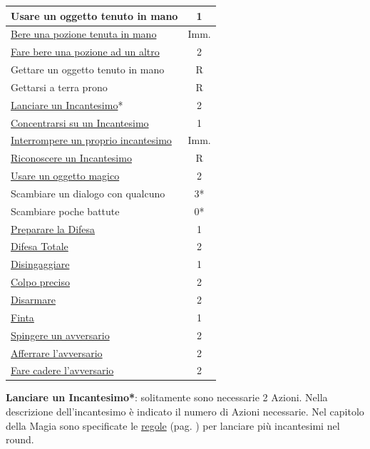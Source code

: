 \begin{multicols}{2}
\begin{tabularx}{1\linewidth}{Xc}
Usare un oggetto tenuto in mano& 1\\
\midrule
\rowcolor{gray!20}\hyperlink{insorgenzaveleno}{Bere una pozione tenuta in mano}& Imm.\\
\hyperlink{insorgenzaveleno}{Fare bere una pozione ad un altro} & 2\\
\midrule
\rowcolor{gray!20}Gettare un oggetto tenuto in mano& R\\
Gettarsi a terra prono& R\\
\midrule
\rowcolor{gray!20}\hyperlink{magietempodilancio}{Lanciare un Incantesimo}*& 2\\
\hyperlink{magieconcentrazione}{Concentrarsi su un Incantesimo}& 1\\
\rowcolor{gray!20}\hyperlink{magiedurata}{Interrompere un proprio incantesimo} & Imm.\\
\hyperlink{riconoscereincantesimo}{Riconoscere un Incantesimo}& R\\
\rowcolor{gray!20}\hyperlink{regoleoggettimagici}{Usare un oggetto magico}& 2\\
\midrule
Scambiare un dialogo con qualcuno& 3*\\
\rowcolor{gray!20}Scambiare poche battute& 0*\\
\midrule
\hyperlink{preparareladifesa}{Preparare la Difesa} & 1\\
\rowcolor{gray!20}\hyperlink{difesatotale}{Difesa Totale} & 2\\
\hyperlink{disingaggiare}{Disingaggiare} & 1\\
\rowcolor{gray!20}\hyperlink{colpopreciso}{Colpo preciso} & 2\\
\midrule
\hyperlink{disarmare}{Disarmare} & 2\\
\rowcolor{gray!20}\hyperlink{finta}{Finta} & 1\\
\hyperlink{spingereavversario}{Spingere un avversario} & 2\\
\rowcolor{gray!20}\hyperlink{afferrareunavversario}{Afferrare l'avversario} & 2\\
\hyperlink{farecadereavversario}{Fare cadere l'avversario} & 2
\end{tabularx}

\medskip

\textbf{Lanciare un Incantesimo*}: solitamente sono necessarie 2 Azioni. Nella descrizione dell'incantesimo è indicato il numero di Azioni necessarie. Nel capitolo della Magia sono specificate le \hyperlink{piumagieround}{regole} (pag. \pageref{piumagieround}) per lanciare più incantesimi nel round.


\end{multicols}
